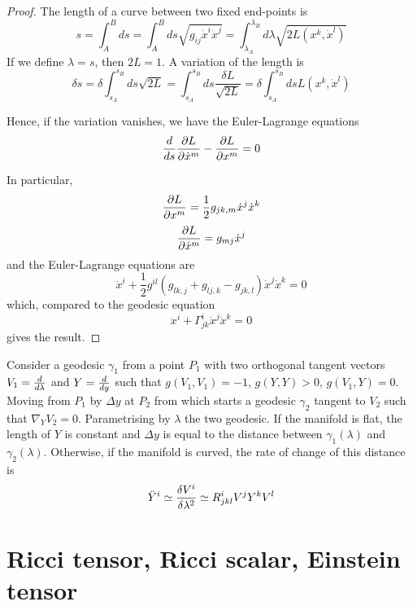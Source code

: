     \begin{proof}
        The length of a curve between two fixed end-points is 
        \begin{equation*}
            s = \int_{A}^{B} ds = \int_{A}^{B} ds \sqrt{g_{ij} \dot x^i \dot x^j} = \int_{\lambda_A}^{\lambda_B} d\lambda \sqrt{2 L(x^k, \dot x^l)}
        \end{equation*}
        If we define $\lambda = s$, then $2L = 1$. A variation of the length is 
        \begin{equation*}
            \delta s = \delta \int_{s_A}^{s_B} ds \sqrt{2L} = \int_{s_A}^{s_B} ds \frac{\delta L}{\sqrt{2L}} = \delta \int_{s_A}^{s_B} ds L(x^k, \dot x^l)
        \end{equation*}

        Hence, if the variation vanishes, we have the Euler-Lagrange equations 
        \begin{equation*}
            \frac{d}{ds} \frac{\partial L}{\partial\dot x^m} - \frac{\partial L}{\partial x^m} = 0
        \end{equation*}

        In particular, 
        \begin{equation*}
            \frac{\partial L}{\partial x^m} = \frac{1}{2} g_{jk,m} \dot x^j \dot x^k
        \end{equation*}
        \begin{equation*}
            \frac{\partial L}{\partial\dot x^m} = g_{mj} \dot x^j
        \end{equation*}
        and the Euler-Lagrange equations are 
        \begin{equation*}
            \ddot x^i + \frac{1}{2} g^{il} (g_{lk,j} + g_{lj,k} - g_{jk,l}) \dot x^j \dot x^k = 0
        \end{equation*}
        which, compared to the geodesic equation 
        \begin{equation*}
            \ddot x^i + \Gamma^i_{jk} \dot x^j \dot x^k = 0
        \end{equation*}
        gives the result.
    \end{proof}

    Consider a geodesic $\gamma_1$ from a point $P_1$ with two orthogonal tangent vectors $V_1 = \frac{d}{d\lambda}$ and $Y = \frac{d}{dy}$ such that $g(V_1,V_1) = -1$, $g(Y, Y) > 0$, $g(V_1, Y) = 0$. Moving from $P_1$ by $\Delta y$ at $P_2$ from which starts a geodesic $\gamma_2$ tangent to $V_2$ such that $\nabla_Y V_2 = 0$. Parametrising by $\lambda$ the two geodesic. If the manifold is flat, the length of $Y$ is constant and $\Delta y$ is equal to the distance between $\gamma_1(\lambda)$ and $\gamma_2(\lambda)$. Otherwise, if the manifold is curved, the rate of change of this distance is 
    \begin{equation*}
        \ddot Y^i \simeq \frac{\delta V^i}{\delta \lambda^2} \simeq R^i_{jkl} V^j Y^k V^l
    \end{equation*}

\chapter{Ricci tensor, Ricci scalar, Einstein tensor}